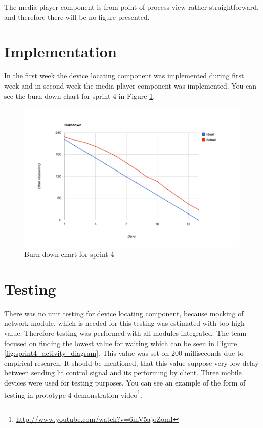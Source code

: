 The media player component is from point of process view rather straightforward, and therefore there will be no figure presented.

\section{Implementation}
In the first week the device locating component was implemented during first week and in second week the media player component was implemented.
You can see the burn down chart for sprint 4 in Figure \ref{fig:Burn4}.

\begin{figure}[h]
	\centering
		\includegraphics[width=18cm]{sprint4/BurndownSprint4.png}
	\caption{Burn down chart for sprint 4}
	\label{fig:Burn4}
\end{figure}

\section{Testing}
There was no unit testing for device locating component, because mocking of network module, which is needed for this testing was estimated with too high value.
Therefore testing was performed with all modules integrated.
The team focused on finding the lowest value for waiting which can be seen in Figure \ref{fig:sprint4_activity_diagram}.
This value was set on 200 milliseconds due to empirical research.
It should be mentioned, that this value suppose very low delay between sending lit control signal and its performing by client.
Three mobile devices were used for testing purposes.
You can see an example of the form of testing in prototype 4 demonstration video\footnote{\url{http://www.youtube.com/watch?v=6mV5ajoZomI}}.


